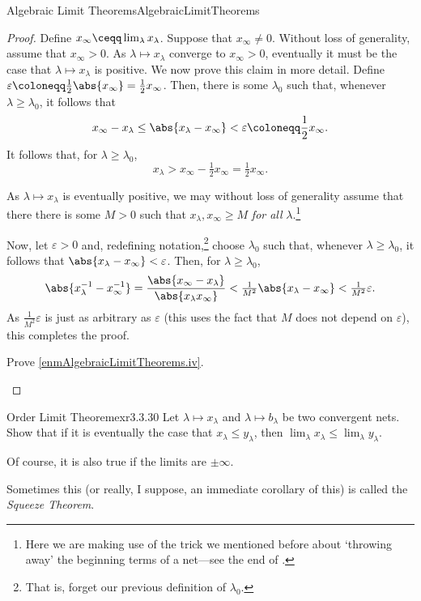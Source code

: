 \begin{prp}{Algebraic Limit Theorems}{AlgebraicLimitTheorems}
\begin{proof}
Define $x_{\infty}\ceqq \lim _{\lambda}x_{\lambda}$.  Suppose that $x_{\infty}\neq 0$.  Without loss of generality, assume that $x_{\infty}>0$.  As $\lambda \mapsto x_{\lambda}$ converge to $x_{\infty}>0$, eventually it must be the case that $\lambda \mapsto x_{\lambda}$ is positive.  We now prove this claim in more detail.  Define $\varepsilon \coloneqq \frac{1}{2}\abs{x_\infty}=\frac{1}{2}x_\infty$.  Then, there is some $\lambda _0$ such that, whenever $\lambda \geq \lambda _0$, it follows that
\begin{equation}
x_\infty -x_\lambda \leq \abs{x_\lambda -x_\infty}<\varepsilon \coloneqq \frac{1}{2}x_\infty .
\end{equation}
It follows that, for $\lambda \geq \lambda _0$,
\begin{equation}
x_\lambda >x_\infty -\tfrac{1}{2}x_\infty =\tfrac{1}{2}x_\infty .
\end{equation}

As $\lambda \mapsto x_\lambda$ is eventually positive, we may without loss of generality assume that there there is some $M>0$ such that $x_\lambda ,x_{\infty}\geq M$ \emph{for all} $\lambda$.\footnote{Here we are making use of the trick we mentioned before about `throwing away' the beginning terms of a net---see the end of .}

Now, let $\varepsilon >0$ and, redefining notation,\footnote{That is, forget our previous definition of $\lambda _0$.} choose $\lambda _0$ such that, whenever $\lambda \geq \lambda _0$, it follows that $\abs{x_\lambda -x_\infty}<\varepsilon$.  Then, for $\lambda \geq \lambda _0$,
\begin{equation}
\abs{x_\lambda ^{-1}-x_\infty ^{-1}}=\frac{\abs{x_\infty -x_\lambda}}{\abs{x_\lambda x_\infty}}<\tfrac{1}{M^2}\abs{x_\lambda -x_\infty}<\tfrac{1}{M^2}\varepsilon .
\end{equation}
As $\frac{1}{M^2}\varepsilon$ is just as arbitrary as $\varepsilon$ (this uses the fact that $M$ does not depend on $\varepsilon$), this completes the proof.
\begin{exr}[breakable=false]{}{}
Prove \cref{enmAlgebraicLimitTheorems.iv}.
\end{exr}
\end{proof}
\end{prp}
\begin{exr}{Order Limit Theorem}{exr3.3.30}
Let $\lambda \mapsto x_\lambda$ and $\lambda \mapsto b_\lambda$ be two convergent nets.  Show that if it is eventually the case that $x_\lambda \leq y_\lambda$, then $\lim _\lambda x_\lambda \leq \lim _\lambda y_\lambda$.
\begin{rmk}
Of course, it is also true if the limits are $\pm \infty$.
\end{rmk}
\begin{rmk}
Sometimes this (or really, I suppose, an immediate corollary of this) is called the \emph{Squeeze Theorem}.
\end{rmk}
\end{exr}
